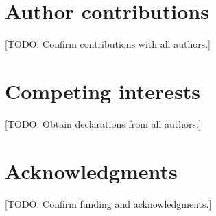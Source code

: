\documentclass[11pt]{article}
\newcommand{\note}[1]{\textcolor{boxrule}{\small[#1]}}
\begin{document}
\section*{Author contributions}
\note{TODO: Confirm contributions with all authors.}

\section*{Competing interests}
\note{TODO: Obtain declarations from all authors.}

\section*{Acknowledgments}
\note{TODO: Confirm funding and acknowledgments.}

\clearpage


\clearpage


\clearpage
\appendix
\renewcommand{\thesection}{S\arabic{section}}
\renewcommand{\thefigure}{S\arabic{figure}}
\renewcommand{\theHfigure}{supp.\arabic{figure}}
\setcounter{figure}{0}



\end{document}
